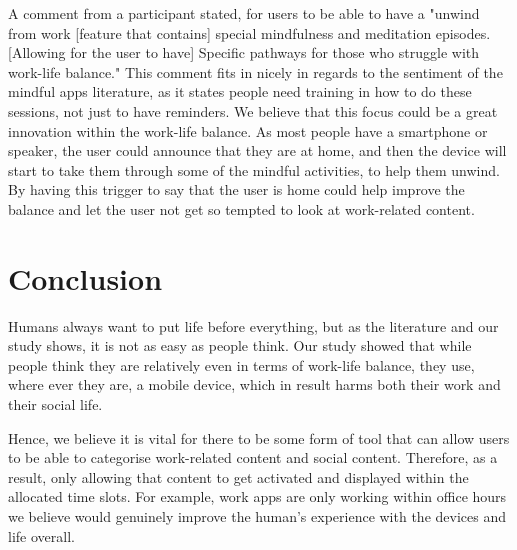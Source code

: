 \documentclass{sigchi}
\begin{document}
	A comment from a participant stated, for users to be able to have a "unwind from work [feature that contains] special mindfulness and meditation episodes. [Allowing for the user to have] Specific pathways for those who struggle with work-life balance." This comment fits in nicely in regards to the sentiment of the mindful apps literature, as it states people need training in how to do these sessions, not just to have reminders. We believe that this focus could be a great innovation within the work-life balance. As most people have a smartphone or speaker, the user could announce that they are at home, and then the device will start to take them through some of the mindful activities, to help them unwind. By having this trigger to say that the user is home could help improve the balance and let the user not get so tempted to look at work-related content. 


\section{Conclusion}
	 
	Humans always want to put life before everything, but as the literature and our study shows, it is not as easy as people think. Our study showed that while people think they are relatively even in terms of work-life balance, they use, where ever they are, a mobile device, which in result harms both their work and their social life. 
	
	Hence, we believe it is vital for there to be some form of tool that can allow users to be able to categorise work-related content and social content. Therefore, as a result, only allowing that content to get activated and displayed within the allocated time slots. For example, work apps are only working within office hours we believe would genuinely improve the human's experience with the devices and life overall. 
	
\balance{}



\end{document}
